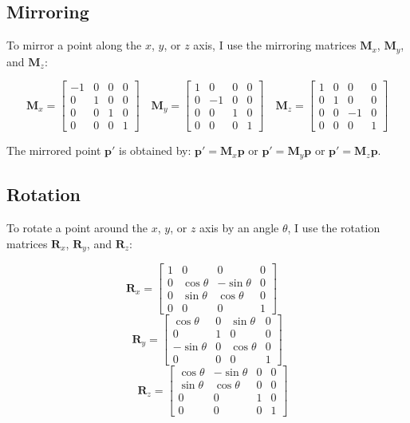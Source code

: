 \documentclass{article}
\begin{document}
	\subsection{Mirroring}
	To mirror a point along the \(x\), \(y\), or \(z\) axis, I use the mirroring matrices \(\bm{M}_x\), \(\bm{M}_y\), and \(\bm{M}_z\):
	
	
	\[
	\bm{M}_x = \begin{bmatrix}
		-1 & 0 & 0 & 0 \\
		0 & 1 & 0 & 0 \\
		0 & 0 & 1 & 0 \\
		0 & 0 & 0 & 1
	\end{bmatrix}
	\quad
	\bm{M}_y = \begin{bmatrix}
		1 & 0 & 0 & 0 \\
		0 & -1 & 0 & 0 \\
		0 & 0 & 1 & 0 \\
		0 & 0 & 0 & 1
	\end{bmatrix}
	\quad
	\bm{M}_z = \begin{bmatrix}
		1 & 0 & 0 & 0 \\
		0 & 1 & 0 & 0 \\
		0 & 0 & -1 & 0 \\
		0 & 0 & 0 & 1
	\end{bmatrix}
	\]
	
	
	The mirrored point \(\bm{p}'\) is obtained by: \(\bm{p}' = \bm{M}_x \bm{p}\) or \(\bm{p}' = \bm{M}_y \bm{p}\) or \(\bm{p}' = \bm{M}_z \bm{p}\).

	\subsection{Rotation}
	To rotate a point around the \(x\), \(y\), or \(z\) axis by an angle \(\theta\), I use the rotation matrices \(\bm{R}_x\), \(\bm{R}_y\), and \(\bm{R}_z\):
	
	
	\[
	\bm{R}_x = \begin{bmatrix}
		1 & 0 & 0 & 0 \\
		0 & \cos \theta & -\sin \theta & 0 \\
		0 & \sin \theta & \cos \theta & 0 \\
		0 & 0 & 0 & 1
	\end{bmatrix}
	\quad 
	\]
	\[
	\bm{R}_y = \begin{bmatrix}
		\cos \theta & 0 & \sin \theta & 0 \\
		0 & 1 & 0 & 0 \\
		-\sin \theta & 0 & \cos \theta & 0 \\
		0 & 0 & 0 & 1
	\end{bmatrix} \]
	\[
	\quad
	\bm{R}_z = \begin{bmatrix}
		\cos \theta & -\sin \theta & 0 & 0 \\
		\sin \theta & \cos \theta & 0 & 0 \\
		0 & 0 & 1 & 0 \\
		0 & 0 & 0 & 1
	\end{bmatrix}
	\]
	
\end{document}
